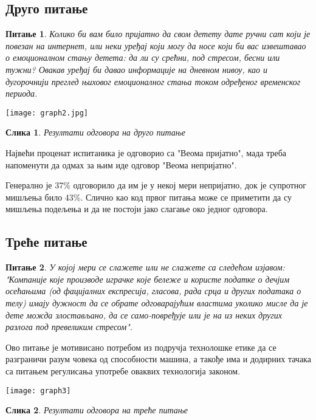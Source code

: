 \documentclass{article}
\newtheorem{question}{Питање}
\newtheorem{image}{Слика}
\begin{document}
\subsection{Друго питање}
\begin{question}
Колико би вам било пријатно да свом детету дате ручни сат који је повезан на интернет, или неки уређај који могу да носе који би вас извештавао о емоционалном стању детета: да ли су срећни, под стресом, бесни или тужни? Овакав уређај би давао информације на дневном нивоу, као и дугорочнији преглед њиховог емоционалног стања током одређеног временског периода.
\end{question}


\texttt{[image: graph2.jpg]}
\begin{image}
\centering
Резултати одговора на друго питање
\end{image}

Највећи проценат испитаника је одговорио са "Веома пријатно", мада треба напоменути да одмах за њим иде одговор "Веома непријатно". 

Генерално је 37\% одговорило да им је у некој мери непријатно, док је супротног мишљења било 43\%. Слично као код првог питања може се приметити да су мишљења подељења и да не постоји јако слагање око једног одговора.


\subsection{Треће питање}
\begin{question}
У којој мери се слажете или не слажете са следећом изјавом: "Компаније које производе играчке које бележе и користе податке о дечјим осећањима (од фацијалних експресија, гласова, рада срца и других података о телу) имају дужност да се обрате одговарајућим  властима уколико мисле да је дете можда злостављано, да се само-повређује или је на из неких других разлога под превеликим стресом".
\end{question}

Ово питање је мотивисано потребом из подручја технолошке етике да се разграничи разум човека од способности машина, а такође има и додирних тачака са питањем регулисања употребе оваквих технологија законом.

\texttt{[image: graph3]}
\begin{image}
\centering
Резултати одговора на треће питање
\end{image}
\end{document}
